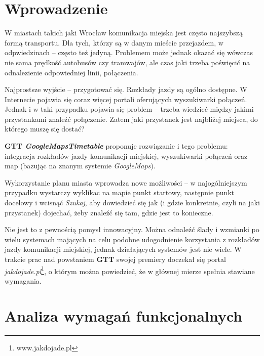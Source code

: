 \documentclass[a4paper,12pt]{article}
\begin{document}
\section*{Wprowadzenie} 


W miastach takich jaki Wrocław komunikacja miejska jest często najszybszą formą
transportu. Dla tych, którzy są w danym mieście przejazdem, w odpwiedzinach --
często też jedyną. Problemem może jednak okazać się wówczas nie sama prędkość
autobusów czy tramwajów, ale czas jaki trzeba poświęcić na odnalezienie odpowiedniej linii, połączenia.

Najprostsze wyjście -- przygotować się. Rozkłady
jazdy są ogólno dostępne. W Internecie pojawia się coraz więcej portali
oferujących wyszukiwarki połączeń. Jednak i w taki przypadku pojawia się
problem -- trzeba wiedzieć między jakimi przystankami znaleźć połączenie. Zatem
jaki przystanek jest najbliżej miejsca, do którego muszę się dostać?

\textbf{GTT \emph{GoogleMapsTimetable}} proponuje rozwiązanie i tego problemu:
integracja rozkładów jazdy komunikacji miejskiej, wyszukiwarki połączeń oraz
map (bazując na znanym systemie \emph{GoogleMaps}).

Wykorzystanie planu miasta wprowadza nowe możliwości -- w najogólniejszym
przypadku wystarczy wyklikac na mapie punkt startowy, następnie punkt docelowy
i wcisnąć \emph{Szukaj}, aby dowiedzieć się jak (i gdzie konkretnie, czyli na
jaki przystanek) dojechać, żeby znaleźć się tam, gdzie jest to konieczne.

Nie jest to z pewnością pomysł innowacyjny. Można odnaleźć ślady i wzmianki
po wielu systemach mających na celu podobne udogodnienie korzystania z
rozkładów jazdy komunikacji miejskiej, jednak działających systemów jest nie
wiele. W trakcie prac nad powstaniem \textbf{GTT} swojej premiery doczekał się
portal \emph{jakdojade.pl}\footnote{www.jakdojade.pl}, o którym można
powiedzieć, że w głównej mierze spełnia stawiane wymagania.

\section{Analiza wymagań funkcjonalnych}
\end{document}
